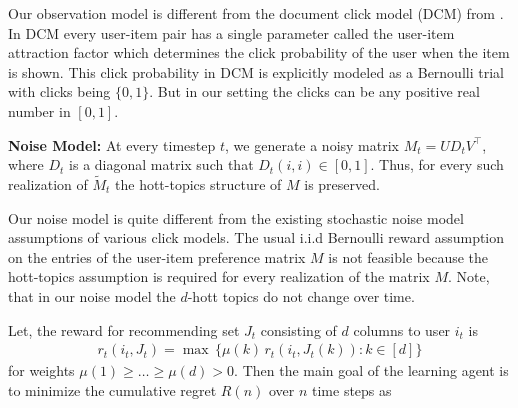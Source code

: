 \begin{discussion}
\label{disc:obs}
Our observation  model is different from the document click model (DCM) from  \citet{craswell2008experimental}. In DCM every user-item pair has a single parameter called the user-item attraction factor which determines the click probability of the user when the item is shown. This click probability in DCM is explicitly modeled as a Bernoulli trial with clicks being $\lbrace 0,1\rbrace$. But in our setting the clicks can be any positive real number in $[0,1]$.
\end{discussion}


\textbf{Noise Model:}  At every timestep $t$, we generate a noisy matrix ${M}_t = UD_t V^{\intercal}$, where $D_t$ is a diagonal matrix such that $D_t(i,i)\in[0,1]$. Thus, for every such realization of $\tilde{M}_t$  the hott-topics structure of $M$ is preserved. 


\begin{discussion}
\label{disc:noise}
Our noise model is quite different from the existing stochastic noise model assumptions of various click models. The usual i.i.d Bernoulli reward assumption on the entries of the user-item preference matrix $M$ is not feasible because the hott-topics assumption is required for every realization of the matrix $M$. Note, that in our noise model the $d$-hott topics do not change over time. 
\end{discussion}


Let, the reward for recommending set $J_t$ consisting of $d$ columns to user $i_t$ is
\begin{align*}
  r_t(i_t, J_t) =
  \max \, \{\mu(k) \, r_t(i_t, J_t(k)): k \in [d]\}
\end{align*}
for weights $\mu(1) \geq \dots \geq \mu(d) > 0$. Then the main goal of the learning agent is to minimize the cumulative regret $R(n)$  over $n$ time steps as 

